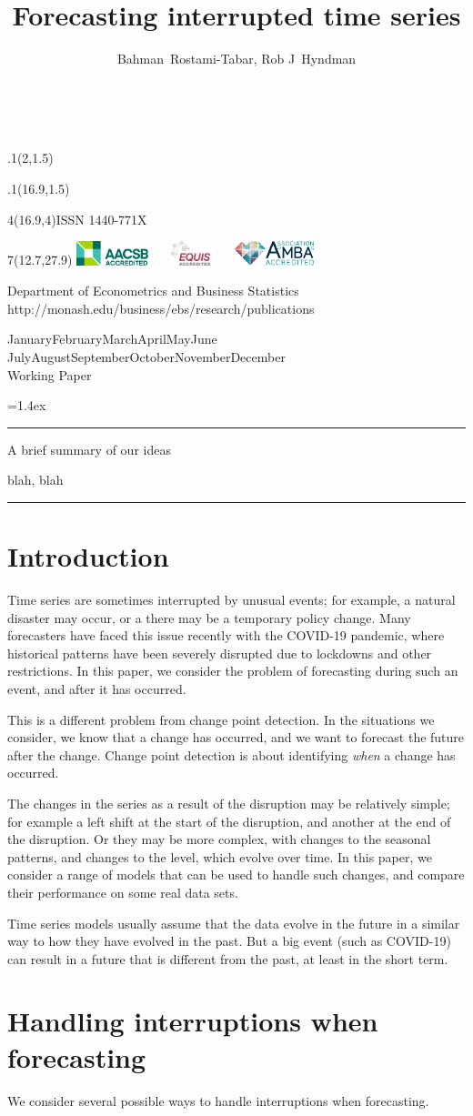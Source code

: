 \documentclass[11pt,a4paper,]{article}
\title{Forecasting interrupted time series}
\author{Bahman~Rostami-Tabar, Rob J~Hyndman}
\date{\sf\Date~\Month~\Year}
\makeatletter
\def\Date{\number\day}
\def\Month{\ifcase\month\or
 January\or February\or March\or April\or May\or June\or
 July\or August\or September\or October\or November\or December\fi}
\def\Year{\number\year}
\def\showjel{{\large\textsf{\textbf{JEL classification:}}~\@jel}}
\def\cover{{\sffamily\setcounter{page}{0}
        \thispagestyle{empty}
        \placefig{2}{1.5}{width=5cm}{_extensions/numbats/wp/monash2}
        \placefig{16.9}{1.5}{width=2.1cm}{_extensions/numbats/wp/MBSportrait}
        \begin{textblock}{4}(16.9,4)ISSN 1440-771X\end{textblock}
        \begin{textblock}{7}(12.7,27.9)\hfill
        \includegraphics[height=0.7cm]{_extensions/numbats/wp/AACSB}~~~
        \includegraphics[height=0.7cm]{_extensions/numbats/wp/EQUIS}~~~
        \includegraphics[height=0.7cm]{_extensions/numbats/wp/AMBA}
        \end{textblock}
        \vspace*{2cm}
        \begin{center}\Large
        Department of Econometrics and Business Statistics\\[.5cm]
        \footnotesize http://monash.edu/business/ebs/research/publications
        \end{center}\vspace{2cm}
        \begin{center}
        \fbox{\parbox{14cm}{\begin{onehalfspace}\centering\Huge\vspace*{0.3cm}
                \textsf{\textbf{\expandafter{\@title}}}\vspace{1cm}\par
                \LARGE\@author\end{onehalfspace}
        }}
        \end{center}
        \vfill
                \begin{center}\Large
                \Month~\Year\\[1cm]
                Working Paper \@wp
        \end{center}\vspace*{2cm}}}
\def\pageone{{\sffamily\setstretch{1}%
        \thispagestyle{empty}%
        \vbox to \textheight{%
        \raggedright\baselineskip=1.2cm
     {\fontsize{24.88}{30}\sffamily\textbf{\expandafter{\@title}}}
        \vspace{2cm}\par
        \hspace{1cm}\parbox{14cm}{\sffamily\large\@addresses}\vspace{1cm}\vfill
        \hspace{1cm}{\large\Date~\Month~\Year}\\[1cm]
        \hspace{1cm}\showjel\vss}}}
\def\blindtitle{{\sffamily
     \thispagestyle{plain}\raggedright\baselineskip=1.2cm
     {\fontsize{24.88}{30}\sffamily\textbf{\expandafter{\@title}}}\vspace{1cm}\par
        }}
\def\titlepage{{\cover\newpage\pageone\newpage\blindtitle}}
\let\maketitle\titlepage
\newenvironment{keywords}{\par\vspace{0.5cm}\noindent{\sffamily\textbf{Keywords:}}}{\vspace{0.25cm}\par\hrule\vspace{0.5cm}\par}
\renewenvironment{abstract}{\begin{minipage}{\textwidth}\parskip=1.4ex\noindent
\hrule\vspace{0.1cm}\par{\sffamily\textbf{\abstractname}}\newline}
  {\end{minipage}}
\def\placefig#1#2#3#4{\begin{textblock}{.1}(#1,#2)\rlap{\texttt{[image: \#4]}}\end{textblock}}
\makeatother
\begin{document}
\maketitle
\begin{abstract}
A brief summary of our ideas
\end{abstract}
\begin{keywords}
blah, blah
\end{keywords}

\section{Introduction}\label{introduction}

Time series are sometimes interrupted by unusual events; for example, a
natural disaster may occur, or a there may be a temporary policy change.
Many forecasters have faced this issue recently with the COVID-19
pandemic, where historical patterns have been severely disrupted due to
lockdowns and other restrictions. In this paper, we consider the problem
of forecasting during such an event, and after it has occurred.

This is a different problem from change point detection. In the
situations we consider, we know that a change has occurred, and we want
to forecast the future after the change. Change point detection is about
identifying \emph{when} a change has occurred.

The changes in the series as a result of the disruption may be
relatively simple; for example a left shift at the start of the
disruption, and another at the end of the disruption. Or they may be
more complex, with changes to the seasonal patterns, and changes to the
level, which evolve over time. In this paper, we consider a range of
models that can be used to handle such changes, and compare their
performance on some real data sets.

Time series models usually assume that the data evolve in the future in
a similar way to how they have evolved in the past. But a big event
(such as COVID-19) can result in a future that is different from the
past, at least in the short term.

\section{Handling interruptions when forecasting}\label{sec-methods}

We consider several possible ways to handle interruptions when
forecasting.
\end{document}

